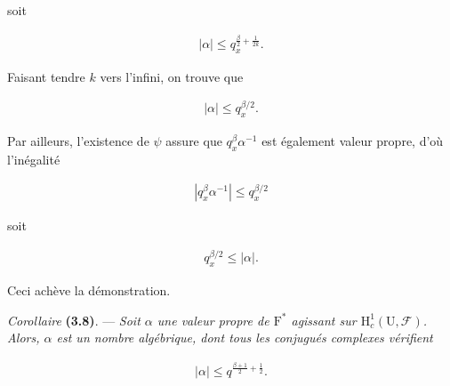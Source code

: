 \documentclass[10pt,leqno]{article}
\begin{document}
\noindent soit\par

\begin{equation*}\begin{gathered}|\alpha | \leq  q_{x}^{\frac{\beta}{2}+\frac{1}{2k}}.\end{gathered}\end{equation*}

\noindent Faisant tendre \(k\) vers l’infini, on trouve que\par

\begin{equation*}\begin{gathered}|\alpha | \leq  q_{x}^{\beta /2}.\end{gathered}\end{equation*}

\noindent Par ailleurs, l’existence de \(\psi \) assure que \(q_{x}^{\beta } \alpha ^{- 1}\) est également valeur propre, d’où l’inégalité\par

\begin{equation*}\begin{gathered}|q_{x}^{\beta } \alpha ^{- 1}| \leq  q_{x}^{\beta /2}\end{gathered}\end{equation*}

\noindent soit\par

\begin{equation*}\begin{gathered}q_{x}^{\beta /2} \leq  |\alpha |.\end{gathered}\end{equation*}

\noindent Ceci achève la démonstration.\par

\clearpage

\label{physical-15}

\noindent \emph{Corollaire} \textbf{(3.8)}. — {\itshape Soit \(\alpha \) une valeur propre de \(\mathrm{F}^{*}\) agissant sur \(\mathrm{H}_{c}^{1}(\mathrm{U},\mathcal{F} )\). Alors, \(\alpha \) est un nombre algébrique, dont tous les conjugués complexes vérifient}\par

\begin{equation*}\begin{gathered}|\alpha | \leq  q^{\frac{\beta+1}{2}+\frac{1}{2}}.\end{gathered}\end{equation*}
\end{document}
